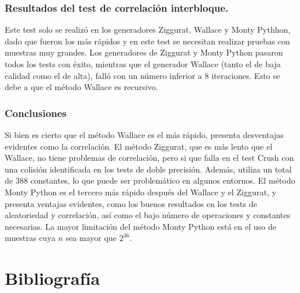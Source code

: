 \documentclass[a4paper,12pt]{article}
\begin{document}
	\subsubsection{Resultados del test de correlación interbloque.}
	Este test solo se realizó en los generadores Ziggurat, Wallace y Monty Pythhon, dado que fueron los más rápidos y en este test se necesitan realizar pruebas con muestras muy grandes. Los generadores de Ziggurat y Monty Python pasaron todos los tests con éxito, mientras que el generador Wallace (tanto el de baja calidad como el de alta), falló con un número inferior a $8$ iteraciones. Esto se debe a que el método Wallace es recursivo.
	
	\subsubsection{Conclusiones}
	Si bien es cierto que el método Wallace es el más rápido, presenta desventajas evidentes como la correlación. 
	El método Ziggurat, que es más lento que el Wallace, no tiene problemas de correlación, pero si que falla en el test Crush con una colisión identificada en los tests de doble precisión. 
	Además, utiliza un total de $388$ constantes, lo que puede ser problemático en algunos entornos. 
	El método Monty Python es el tercero más rápido después del Wallace y el Ziggurat, y presenta ventajas evidentes, como los buenos resultados en los tests de aleatoriedad y correlación, así como el bajo número de operaciones y constantes necesarias. 
	La mayor limitación del método Monty Python está en el uso de muestras cuya $n$ sea mayor que $2^{36}$. 
	
	
	

	
\newpage
	\section*{Bibliografía}
	
	
	
\end{document}
